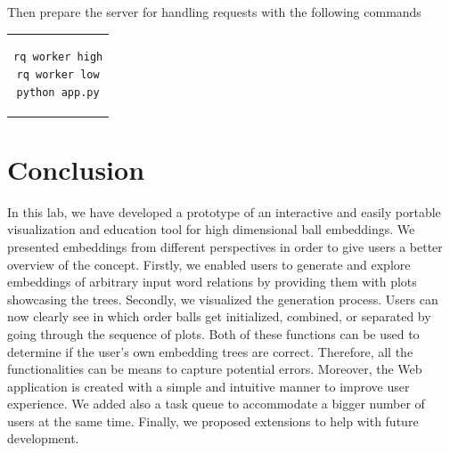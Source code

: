 \documentclass[]{article}
\begin{document}
Then prepare the server for handling requests with the following commands

\begin{center}
\begin{tabular}{c}
\begin{lstlisting}
rq worker high
rq worker low
python app.py
\end{lstlisting}
\end{tabular}
\end{center}


\section{Conclusion}
In this lab, we have developed a prototype of an interactive and easily portable visualization and education tool for high dimensional ball embeddings. We presented embeddings from different perspectives in order to give users a better overview of the concept. Firstly, we enabled users to generate and explore embeddings of arbitrary input word relations by providing them with plots showcasing the trees. Secondly, we visualized the generation process. Users can now clearly see in which order balls get initialized, combined, or separated by going through the sequence of plots. Both of these functions can be used to determine if the user's own embedding trees are correct. Therefore, all the functionalities can be means to capture potential errors. Moreover, the Web application is created with a simple and intuitive manner to improve user experience. We added also a task queue to accommodate a bigger number of users at the same time. Finally, we proposed extensions to help with future development. 

	
	
	
	 
\end{document}
